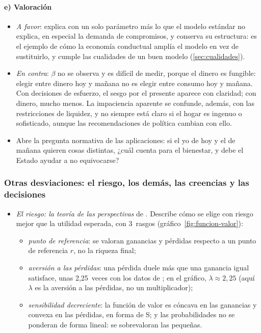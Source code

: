 \documentclass[11pt]{article}
\begin{document}
\paragraph{e) Valoración}

\begin{itemize}
\item \emph{A favor}: explica con un solo parámetro más lo que el modelo estándar no explica, en especial la demanda de compromisos, y conserva su estructura: es el ejemplo de cómo la economía conductual amplía el modelo en vez de sustituirlo, y cumple las cualidades de un buen modelo (\ref{sec:cualidades}).
\item \emph{En contra}: $\beta$ no se observa y es difícil de medir, porque el dinero es fungible: elegir entre dinero hoy y mañana no es elegir entre consumo hoy y mañana. Con decisiones de esfuerzo, el sesgo por el presente aparece con claridad; con dinero, mucho menos\nocite{AndreoniSprenger2012Estimating,AugenblickNiederleSprenger2015Working}. La impaciencia aparente se confunde, además, con las restricciones de liquidez, y no siempre está claro si el hogar es ingenuo o sofisticado, aunque las recomendaciones de política cambian con ello.
\item Abre la pregunta normativa de las aplicaciones: si el yo de hoy y el de mañana quieren cosas distintas, ¿cuál cuenta para el bienestar, y debe el Estado ayudar a no equivocarse?
\end{itemize}

\subsubsection{Otras desviaciones: el riesgo, los demás, las creencias y las decisiones}\label{sec:desviaciones}

\begin{itemize}
\item \emph{El riesgo: la teoría de las perspectivas} de \textcite{KahnemanTversky1979Prospect} . Describe cómo se elige con riesgo mejor que la utilidad esperada, con 3~rasgos (gráfico~\ref{fig:funcion-valor}):
  \begin{itemize}
  \item \emph{punto de referencia}: se valoran ganancias y pérdidas respecto a un punto de referencia $r$, no la riqueza final;
  \item \emph{aversión a las pérdidas}: una pérdida duele más que una ganancia igual satisface, unas 2,25~veces con los datos de \textcite{TverskyKahneman1992Advances}; en el gráfico, $\lambda\approx2{,}25$ (aquí $\lambda$ es la aversión a las pérdidas, no un multiplicador);
  \item \emph{sensibilidad decreciente}: la función de valor es cóncava en las ganancias y convexa en las pérdidas, en forma de S; y las probabilidades no se ponderan de forma lineal: se sobrevaloran las pequeñas.
  \end{itemize}
\end{itemize}
\end{document}
